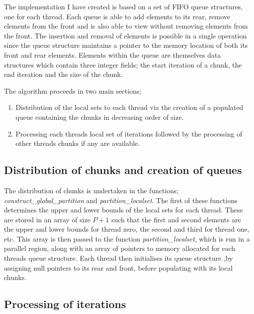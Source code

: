 \documentclass[12pt]{article} %
\begin{document}
The implementation I have created is based on a set of FIFO queue structures, one for each thread. Each queue is able to add elements to its rear, remove elements from the front and is also able to view without removing elements from the front. The insertion and removal of elements is possible in a single operation since the queue structure maintains a pointer to the memory location of both its front and rear elements. Elements within the queue are themselves data structures which contain three integer fields; the start iteration of a chunk, the end iteration and the size of the chunk.

The algorithm proceeds in two main sections;

\begin{enumerate}
  \item Distribution of the local sets to each thread via the creation of a populated queue containing the chunks in decreasing order of size.
  \item Processing each threads local set of iterations followed by the processing of other threads chunks if any are available.  
  \end{enumerate}
  
  
 \subsection{Distribution of chunks and creation of queues}
 
The distribution of chunks is undertaken in the functions; \textit{construct\_global\_partition} and \textit{partition\_localset}. The first of these functions determines the upper and lower bounds of the local sets for each thread. These are stored in an array of size $P+1$ such that the first and second elements are the upper and lower bounds for thread zero, the second and third for thread one, etc. This array is then passed to the function \textit{partition\_localset}, which is run in a parallel region, along with an array of pointers to memory allocated for each threads queue structure. Each thread then initialises its queue structure ,by assigning null pointers to its rear and front, before populating with its local chunks.  
 
 \subsection{Processing of iterations}
 
\end{document}
